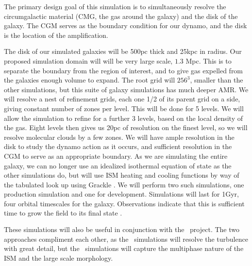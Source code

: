 The primary design goal of this simulation is to simultaneously resolve the
circumgalactic material (CMG, the gas around the galaxy) and the disk of the
galaxy.  The CGM serves as the
boundary condition for our dynamo, and the disk is the location of the
amplification.

The disk of our simulated galaxies will be 500pc thick and 25kpc in radius.  Our
proposed simulation domain will will be very large scale, $1.3$ Mpc.  This is to
separate the boundary from the region of interest, and to give gas expelled from
the galaxies
enough volume to expand.  The root grid will $256^3$, smaller than the
other simulations, but this suite of galaxy simulations has much deeper AMR.  We will resolve a nest of refinement grids, each one
1/2 of its parent grid on a side, giving constant number of zones per level.
This will be done for 5 levels.  We will allow the simulation to 
refine for a further 3 levels, based on the local density of the gas.  Eight
levels then gives us 20pc of resolution on the finest
level, so we will resolve molecular clouds by a few zones.  We will have ample
resolution in the disk to study the dynamo action as it occurs, and sufficient
resolution in the CGM to serve as an appropriate boundary.  As we are simulating
the entire galaxy, we can no longer use an idealized isothermal equation of
state as the other simulations do, but will use ISM heating and cooling functions by way of the
tabulated look up using Grackle \citep{Smith17}.  We will perform two such
simulations, one production simulation and one for development.
Simulations will last for 1Gyr, four orbital timescales for the galaxy.
Observations indicate that this is sufficient time to grow the field to its
final state \citep{Mao17}.

These simulations will also be useful in conjunction with the \nameCMB\ project.
The two approaches compliment each other, as the \nameCMB\ simulations will
resolve the turbulence with great detail, but the \nameGalaxies\ simulations
will capture the multiphase nature of the ISM and the large scale morphology.
